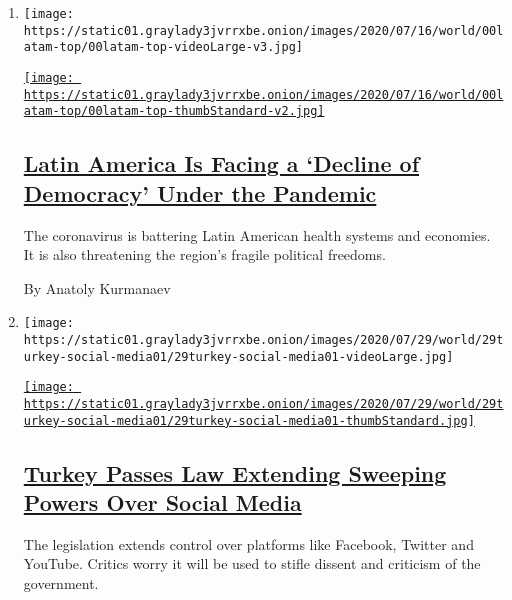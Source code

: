 \begin{enumerate}
\def\labelenumi{\arabic{enumi}.}
\item
  \texttt{[image: https://static01.graylady3jvrrxbe.onion/images/2020/07/16/world/00latam-top/00latam-top-videoLarge-v3.jpg]}

  \href{/2020/07/29/world/americas/latin-america-democracy-pandemic.html}{\texttt{[image: https://static01.graylady3jvrrxbe.onion/images/2020/07/16/world/00latam-top/00latam-top-thumbStandard-v2.jpg]}}

  \hypertarget{latin-america-is-facing-a-decline-of-democracy-under-the-pandemic}{%
  \subsection{\texorpdfstring{\href{/2020/07/29/world/americas/latin-america-democracy-pandemic.html}{Latin
  America Is Facing a `Decline of Democracy' Under the
  Pandemic}}{Latin America Is Facing a `Decline of Democracy' Under the Pandemic}}\label{latin-america-is-facing-a-decline-of-democracy-under-the-pandemic}}

  The coronavirus is battering Latin American health systems and
  economies. It is also threatening the region's fragile political
  freedoms.

  By Anatoly Kurmanaev
\item
  \texttt{[image: https://static01.graylady3jvrrxbe.onion/images/2020/07/29/world/29turkey-social-media01/29turkey-social-media01-videoLarge.jpg]}

  \href{/2020/07/29/world/europe/turkey-social-media-control.html}{\texttt{[image: https://static01.graylady3jvrrxbe.onion/images/2020/07/29/world/29turkey-social-media01/29turkey-social-media01-thumbStandard.jpg]}}

  \hypertarget{turkey-passes-law-extending-sweeping-powers-over-social-media}{%
  \subsection{\texorpdfstring{\href{/2020/07/29/world/europe/turkey-social-media-control.html}{Turkey
  Passes Law Extending Sweeping Powers Over Social
  Media}}{Turkey Passes Law Extending Sweeping Powers Over Social Media}}\label{turkey-passes-law-extending-sweeping-powers-over-social-media}}

  The legislation extends control over platforms like Facebook, Twitter
  and YouTube. Critics worry it will be used to stifle dissent and
  criticism of the government.


\end{enumerate}

